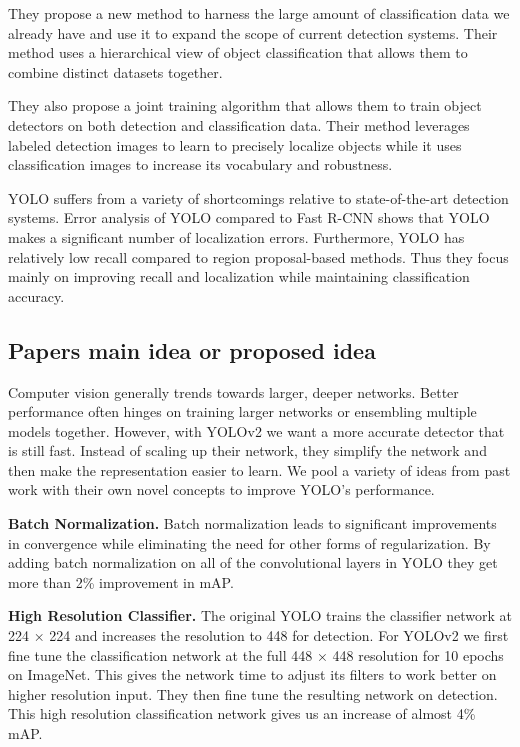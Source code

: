 \documentclass{ieeeaccess}
\begin{document}
They propose a new method to harness the large amount of classification data we already have and use it to expand the scope of current detection systems. Their method uses a hierarchical view of object classification that allows them to combine distinct datasets together.

They also propose a joint training algorithm that allows them to train object detectors on both detection and classification data. Their method leverages labeled detection images to learn to precisely localize objects while it uses classification images to increase its vocabulary and robustness.

YOLO suffers from a variety of shortcomings relative to state-of-the-art detection systems. Error analysis of YOLO compared to Fast R-CNN shows that YOLO makes a significant number of localization errors. Furthermore, YOLO has relatively low recall compared to region proposal-based methods. Thus they focus mainly on improving recall and localization while maintaining classification accuracy.

\subsection{Papers main idea or proposed idea}
Computer vision generally trends towards larger, deeper networks. Better performance often hinges on training larger networks or ensembling multiple models together. However, with YOLOv2 we want a more accurate detector that is still fast. Instead of scaling up their network, they simplify the network and then make the representation easier to learn. We pool a variety of ideas from past work with their own novel concepts to improve YOLO’s performance.

\textbf{Batch Normalization.} Batch normalization leads to significant improvements in convergence while eliminating the
need for other forms of regularization. By adding batch normalization on all of the convolutional layers in YOLO they get more than 2\% improvement in mAP.

\textbf{High Resolution Classifier.}  The original YOLO trains the classifier network at 224 × 224 and increases the resolution to 448 for detection. For YOLOv2 we first fine tune the classification network at the full 448 × 448 resolution for 10 epochs on ImageNet. This gives the network time to adjust its filters to work better on higher resolution input. They then fine tune the resulting network on detection. This high resolution classification network gives us an increase of almost 4\% mAP.
\end{document}
